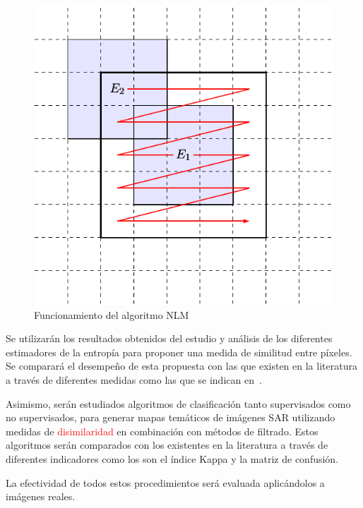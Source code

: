 \documentclass[11pt]{article}
\begin{document}
\begin{figure}[hbt]
	\label{NLM}
	\centering
	\includegraphics[scale=0.6]{../../Figures/Proyectos/UNGS2020/filtros.pdf}
	\caption{Funcionamiento del algoritmo NLM}
\end{figure}

Se utilizarán los resultados obtenidos del estudio y análisis de los diferentes estimadores de la entropía para proponer una medida de similitud entre píxeles. Se comparará el desempeño de esta propuesta con las que existen en la literatura a través de diferentes medidas como las que se indican en~\cite{Frery2019}.

Asimismo, serán estudiados algoritmos de clasificación tanto supervisados como no supervisados, para generar mapas temáticos de imágenes SAR utilizando medidas de \textcolor{red}{disimilaridad} en combinación con métodos de filtrado. 
Estos algoritmos serán comparados con los existentes en la literatura a través de diferentes indicadores como los son el índice Kappa y la matriz de confusión.

La efectividad de todos estos procedimientos será evaluada aplicándolos a imágenes reales.
\end{document}
